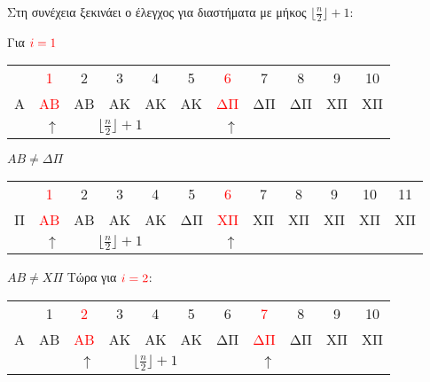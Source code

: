 \documentclass[a4paper]{article}
\begin{document}
\begin{itemize}
Στη συνέχεια ξεκινάει ο έλεγχος για διαστήματα με μήκος $\lfloor\frac{n}{2}\rfloor+1$:\\
\pagebreak

Για $\textcolor{red}{i=1}$
\begin{center}
\begin{tabular}{r|c|c|c|c|c|c|c|c|c|c|}
\multicolumn{1}{r}{} & \multicolumn{1}{c}{\textcolor{red}{1}} & \multicolumn{1}{c}{2} & \multicolumn{1}{c}{3} & \multicolumn{1}{c}{4} & \multicolumn{1}{c}{5} & \multicolumn{1}{c}{\textcolor{red}{6}} & \multicolumn{1}{c}{7} & \multicolumn{1}{c}{8} & \multicolumn{1}{c}{9} & \multicolumn{1}{c}{10}\\
\cline{2-11}
Α & \textcolor{red}{ΑΒ} & ΑΒ & ΑΚ & ΑΚ & ΑΚ & \textcolor{red}{ΔΠ} & ΔΠ & ΔΠ & ΧΠ & ΧΠ\\
\cline{2-11}
\multicolumn{2}{r}{$\uparrow$} & \multicolumn{3}{c}{$\lfloor\frac{n}{2}\rfloor+1$} & \multicolumn{2}{r}{$\uparrow$}\\
\cline{2-7}
\end{tabular}
\end{center}

$AB\neq ΔΠ$

\begin{center}
\begin{tabular}{r|c|c|c|c|c|c|c|c|c|c|c|}
\multicolumn{1}{r}{} & \multicolumn{1}{c}{\textcolor{red}{1}} & \multicolumn{1}{c}{2} & \multicolumn{1}{c}{3} & \multicolumn{1}{c}{4} & \multicolumn{1}{c}{5} & \multicolumn{1}{c}{\textcolor{red}{6}} & \multicolumn{1}{c}{7} & \multicolumn{1}{c}{8} & \multicolumn{1}{c}{9} & \multicolumn{1}{c}{10} & \multicolumn{1}{c}{11}\\
\cline{2-12}
Π & \textcolor{red}{ΑΒ} & ΑΒ & ΑΚ & ΑΚ & ΔΠ & \textcolor{red}{ΧΠ} & ΧΠ & ΧΠ & ΧΠ & ΧΠ & ΧΠ \\
\cline{2-12}
\multicolumn{2}{r}{$\uparrow$} & \multicolumn{3}{c}{$\lfloor\frac{n}{2}\rfloor+1$} & \multicolumn{2}{r}{$\uparrow$}\\
\cline{2-7}
\end{tabular}
\end{center}

$AB\neq XΠ$\newline
Tώρα για $\textcolor{red}{i=2}$:

\begin{center}
\begin{tabular}{r|c|c|c|c|c|c|c|c|c|c|}
\multicolumn{1}{r}{} & \multicolumn{1}{c}{1} & \multicolumn{1}{c}{\textcolor{red}{2}} & \multicolumn{1}{c}{3} & \multicolumn{1}{c}{4} & \multicolumn{1}{c}{5} & \multicolumn{1}{c}{6} & \multicolumn{1}{c}{\textcolor{red}{7}} & \multicolumn{1}{c}{8} & \multicolumn{1}{c}{9} & \multicolumn{1}{c}{10}\\
\cline{2-11}
Α & ΑΒ & \textcolor{red}{ΑΒ} & ΑΚ & ΑΚ & ΑΚ & ΔΠ & \textcolor{red}{ΔΠ} & ΔΠ & ΧΠ & ΧΠ\\
\cline{2-11}
\multicolumn{3}{r}{$\uparrow$} & \multicolumn{3}{c}{$\lfloor\frac{n}{2}\rfloor+1$} & \multicolumn{2}{r}{$\uparrow$}\\
\cline{3-8}
\end{tabular}
\end{center}


\end{itemize}
\end{document}
